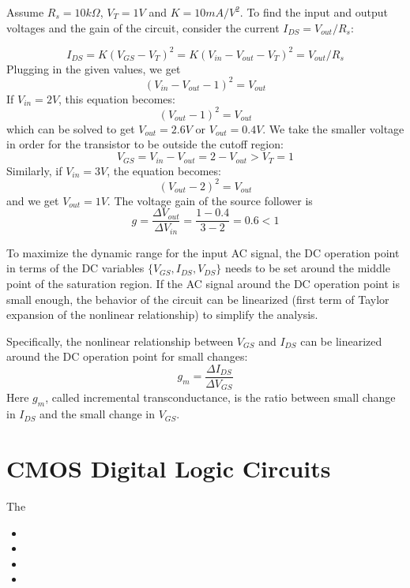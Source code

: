\begin{itemize}

Assume $R_s=10 k\Omega$, $V_T=1V$ and $K=10 mA/V^2$. To find the input and output 
voltages and the gain of the circuit, consider the current $I_{DS}=V_{out}/R_s$:

\[ I_{DS}=K(V_{GS}-V_T)^2=K(V_{in}-V_{out}-V_T)^2=V_{out}/R_s \]
Plugging in the given values, we get
\[ (V_{in}-V_{out}-1)^2=V_{out} \]
If $V_{in}=2V$, this equation becomes:
\[ (V_{out}-1)^2=V_{out} \]
which can be solved to get $V_{out}=2.6V$ or $V_{out}=0.4V$. We take the smaller 
voltage in order for the transistor to be outside the cutoff region:
\[ V_{GS}=V_{in}-V_{out}=2-V_{out}>V_T=1 \]
Similarly, if $V_{in}=3V$, the equation becomes:
\[ (V_{out}-2)^2=V_{out} \]
and we get $V_{out}=1V$. The voltage gain of the source follower is 
\[ g=\frac{\Delta V_{out}}{\Delta V_{in}}=\frac{1-0.4}{3-2}=0.6<1 \]

To maximize the dynamic range for the input AC signal, the DC operation point
in terms of the DC variables $\{V_{GS}, I_{DS}, V_{DS}\}$ needs to be set around
the middle point of the saturation region. If the AC signal around the DC 
operation point is small enough, the behavior of the circuit can be linearized
(first term of Taylor expansion of the nonlinear relationship) to simplify the
analysis. 


Specifically, the nonlinear relationship between $V_{GS}$ and $I_{DS}$ can 
be linearized around the DC operation point for small changes:
\[ g_m=\frac{\Delta I_{DS}}{\Delta V_{GS}} \]
Here $g_m$, called incremental transconductance, is the ratio between small 
change in $I_{DS}$ and the small change in $V_{GS}$.

\section{CMOS Digital Logic Circuits}

The 

\begin{itemize}
\item {}
\item {}
\item {}
\item {}
\end{itemize}




\end{itemize}
